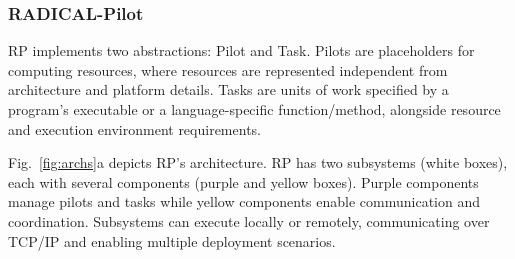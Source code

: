 \documentclass[preprint,12pt, a4paper]{elsarticle}
\begin{document}

\subsubsection{RADICAL-Pilot}\label{sssec:arch_rp}

RP implements two abstractions: Pilot and Task. Pilots are placeholders for
computing resources, where resources are represented independent from
architecture and platform details. Tasks are units of work specified by a
program's executable or a language-specific function/method, alongside resource
and execution environment requirements.

Fig.~\ref{fig:archs}a depicts RP's architecture. RP has two subsystems (white
boxes), each with several components (purple and yellow boxes). Purple
components manage pilots and tasks while yellow components enable communication
and coordination. Subsystems can execute locally or remotely, communicating over
TCP/IP and enabling multiple deployment scenarios.

\end{document}
